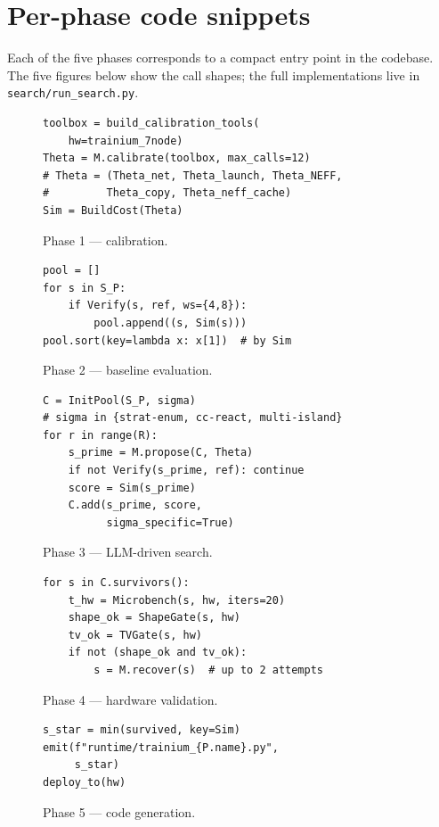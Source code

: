 \section{Per-phase code snippets}
\label{sec:phase-code}

Each of the five phases corresponds to a compact entry point in
the codebase. The five figures below show the call shapes; the
full implementations live in \texttt{search/run\_search.py}.

\begin{figure}[!htbp]
\centering
\begin{BVerbatim}[fontsize=\footnotesize]
toolbox = build_calibration_tools(
    hw=trainium_7node)
Theta = M.calibrate(toolbox, max_calls=12)
# Theta = (Theta_net, Theta_launch, Theta_NEFF,
#         Theta_copy, Theta_neff_cache)
Sim = BuildCost(Theta)
\end{BVerbatim}
\caption{Phase 1 --- calibration.}
\label{fig:phase1}
\end{figure}

\begin{figure}[!htbp]
\centering
\begin{BVerbatim}[fontsize=\footnotesize]
pool = []
for s in S_P:
    if Verify(s, ref, ws={4,8}):
        pool.append((s, Sim(s)))
pool.sort(key=lambda x: x[1])  # by Sim
\end{BVerbatim}
\caption{Phase 2 --- baseline evaluation.}
\label{fig:phase2}
\end{figure}

\begin{figure}[!htbp]
\centering
\begin{BVerbatim}[fontsize=\footnotesize]
C = InitPool(S_P, sigma)
# sigma in {strat-enum, cc-react, multi-island}
for r in range(R):
    s_prime = M.propose(C, Theta)
    if not Verify(s_prime, ref): continue
    score = Sim(s_prime)
    C.add(s_prime, score,
          sigma_specific=True)
\end{BVerbatim}
\caption{Phase 3 --- LLM-driven search.}
\label{fig:phase3}
\end{figure}

\begin{figure}[!htbp]
\centering
\begin{BVerbatim}[fontsize=\footnotesize]
for s in C.survivors():
    t_hw = Microbench(s, hw, iters=20)
    shape_ok = ShapeGate(s, hw)
    tv_ok = TVGate(s, hw)
    if not (shape_ok and tv_ok):
        s = M.recover(s)  # up to 2 attempts
\end{BVerbatim}
\caption{Phase 4 --- hardware validation.}
\label{fig:phase4}
\end{figure}

\begin{figure}[!htbp]
\centering
\begin{BVerbatim}[fontsize=\footnotesize]
s_star = min(survived, key=Sim)
emit(f"runtime/trainium_{P.name}.py",
     s_star)
deploy_to(hw)
\end{BVerbatim}
\caption{Phase 5 --- code generation.}
\label{fig:phase5}
\end{figure}

